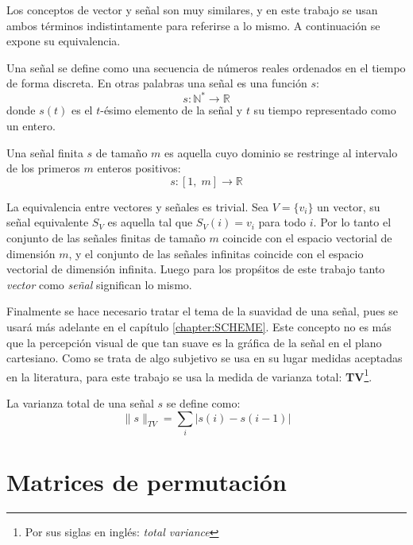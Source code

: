 Los conceptos de vector y señal son muy similares, y en este trabajo se usan ambos t\'erminos indistintamente para referirse a lo mismo. A continuaci\'on se expone su equivalencia.
\begin{definition}
	Una señal se define como una secuencia de n\'umeros reales ordenados en el tiempo de forma discreta. En otras palabras una señal es una función $s$:
	\begin{equation}
		s : \mathbb{N}^\ast \rightarrow \mathbb{R}
	\end{equation}
	donde $s(t)$ es el $t$-\'esimo elemento de la señal y $t$ su tiempo representado como un entero. 
\end{definition}
\begin{definition}
	Una señal finita $s$ de tamaño $m$ es aquella cuyo dominio se restringe al intervalo de los primeros $m$ enteros positivos:
	\begin{equation}
		s : [1,\;m] \rightarrow \mathbb{R}
	\end{equation}
\end{definition}
La equivalencia entre vectores y señales es trivial. Sea $V = \{v_i\}$ un vector, su señal equivalente $S_V$ es aquella tal que $S_V(i) = v_i$ para todo $i$. Por lo tanto el conjunto de las señales finitas de tamaño $m$ coincide con el espacio vectorial de dimensi\'on $m$, y el conjunto de las señales infinitas coincide con el espacio vectorial de dimensi\'on infinita. Luego para los prop\'sitos de este trabajo tanto \textit{vector} como \textit{señal} significan lo mismo.

Finalmente se hace necesario tratar el tema de la suavidad de una señal, pues se usar\'a m\'as adelante en el cap\'itulo \ref{chapter:SCHEME}. Este concepto no es m\'as que la percepci\'on visual de que tan suave es la gr\'afica de la señal en el plano cartesiano. Como se trata de algo subjetivo se usa en su lugar medidas aceptadas en la literatura, para este trabajo se usa la medida de varianza total: \textbf{TV}\footnote{Por sus siglas en ingl\'es: \textit{total variance}}.
\begin{definition}
	La varianza total de una señal $s$ se define como:
	\begin{equation}
		\|s\|_{TV} = \sum_{i}|s(i) - s(i - 1)|
	\end{equation}
\end{definition}

\section{Matrices de permutaci\'on}\label{sec:permutation_matrices}

